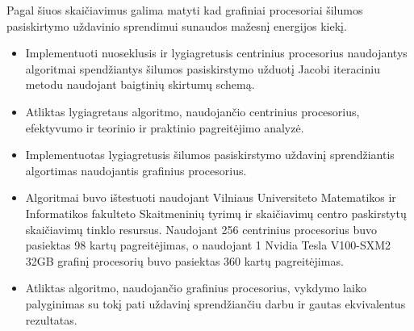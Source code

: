 \documentclass{VUMIFPSbakalaurinis}
\begin{document}
Pagal šiuos skaičiavimus galima matyti kad grafiniai procesoriai šilumos pasiskirtymo uždavinio sprendimui sunaudos mažesnį energijos kiekį.


\begin{itemize}
    \item Implementuoti nuoseklusis ir lygiagretusis centrinius procesorius naudojantys algoritmai  spendžiantys šilumos pasiskirstymo užduotį Jacobi iteraciniu metodu naudojant baigtinių skirtumų schemą.
    \item Atliktas lygiagretaus algoritmo, naudojančio centrinius procesorius, efektyvumo ir teorinio ir praktinio pagreitėjimo analyzė.
    \item Implementuotas lygiagretusis šilumos pasiskirstymo uždavinį sprendžiantis algortimas naudojantis grafinius procesorius.
    \item Algoritmai buvo ištestuoti naudojant Vilniaus Universiteto Matematikos ir Informatikos fakulteto Skaitmeninių tyrimų ir skaičiavimų centro paskirstytų skaičiavimų tinklo resursus.
          Naudojant 256 centrinius procesorius buvo pasiektas 98 kartų pagreitėjimas, o naudojant 1 Nvidia Tesla V100-SXM2 32GB grafinį procesorių buvo pasiektas 360 kartų pagreitėjimas.
    \item Atliktas algoritmo, naudojančio grafinius procesorius, vykdymo laiko palyginimas su tokį pati uždavinį sprendžiančiu darbu \cite{belhaous2021comparative} ir gautas ekvivalentus rezultatas.
\end{itemize}
\end{document}
